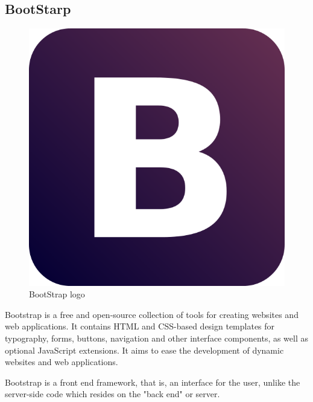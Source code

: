 \subsection{BootStarp} 
\begin{figure}[h]
\centering \includegraphics[scale=0.2]{input/images/boot.png}
\caption{BootStrap logo}
\end{figure}

Bootstrap is a free and open-source collection of tools for creating websites and web applications. It contains HTML and CSS-based design templates for typography, forms, buttons, navigation and other interface components, as well as optional JavaScript extensions. It aims to ease the development of dynamic websites and web applications.

Bootstrap is a front end framework, that is, an interface for the user, unlike the server-side code which resides on the "back end" or server.



